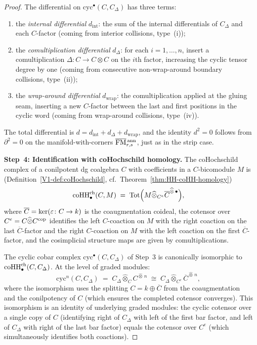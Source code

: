 \begin{proof}
The differential on $\mathrm{cyc}^\bullet(C, C_\Delta)$ has three
terms:
\begin{enumerate}[label=(\alph*)]
\item the \emph{internal differential} $d_{\mathrm{int}}$:
 the sum of the internal differentials of $C_\Delta$ and each
 $C$-factor (coming from interior collisions, type~(i));
\item the \emph{comultiplication differential} $d_\Delta$:
 for each $i = 1, \ldots, n$, insert a comultiplication
 $\Delta\colon C \to C \otimes C$ on the $i$th factor,
 increasing the cyclic tensor degree by one (coming from
 consecutive non-wrap-around boundary collisions, type~(ii));
\item the \emph{wrap-around differential} $d_{\mathrm{wrap}}$:
 the comultiplication applied at the gluing seam, inserting a new
 $C$-factor between the last and first positions in the cyclic
 word (coming from wrap-around collisions, type~(iv)).
\end{enumerate}
The total differential is
$d = d_{\mathrm{int}} + d_\Delta + d_{\mathrm{wrap}}$,
and the identity $d^2 = 0$ follows from $\partial^2 = 0$
on the manifold-with-corners
$\overline{\mathrm{FM}}{}^{\,\mathrm{ann}}_{r,s}$,
just as in the strip case.

\medskip\noindent
\textbf{Step~4: Identification with coHochschild homology.}
The coHochschild complex of a conilpotent dg coalgebra $C$ with
coefficients in a $C$-bicomodule $M$ is
(Definition~\ref*{V1-def:coHochschild},
cf.\ Theorem~\ref{thm:HH-coHH-homology})
\[
\operatorname{coHH}^{\mathrm{ch}}_\bullet(C, M)
\;=\;
\operatorname{Tot}\Bigl(
M \widehat\otimes_{C^e} \overline{C}^{\widehat\otimes\, \bullet}
\Bigr),
\]
where $\overline C = \ker(\varepsilon\colon C \to k)$ is the coaugmentation
coideal, the cotensor over $C^e = C \widehat\otimes C^{\mathrm{cop}}$
identifies the left $C$-coaction on $M$ with the right coaction on
the last $\overline C$-factor and the right $C$-coaction on $M$
with the left coaction on the first $\overline C$-factor, and the
cosimplicial structure maps are given by comultiplications.

The cyclic cobar complex $\mathrm{cyc}^\bullet(C, C_\Delta)$
of Step~3 is canonically isomorphic to
$\operatorname{coHH}^{\mathrm{ch}}_\bullet(C, C_\Delta)$.
At the level of graded modules:
\[
\mathrm{cyc}^n(C, C_\Delta)
\;=\;
C_\Delta \widehat\otimes_C C^{\widehat\otimes\, n}
\;\cong\;
C_\Delta \widehat\otimes_{C^e} \overline{C}^{\widehat\otimes\, n},
\]
where the isomorphism uses the splitting
$C = k \oplus \overline C$ from the coaugmentation and the
conilpotency of $C$ (which ensures the completed cotensor converges).
This isomorphism is an identity of underlying graded modules: the
cyclic cotensor over a single copy of $C$ (identifying right of
$C_\Delta$ with left of the first bar factor, and left of $C_\Delta$
with right of the last bar factor) equals the cotensor over
$C^e$ (which simultaneously identifies both coactions).


\end{proof}
